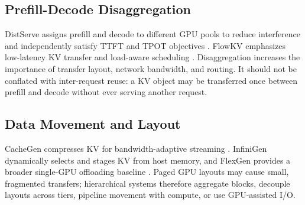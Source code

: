 \documentclass[conference,10pt]{IEEEtran}
\newcommand{\ttft}{TTFT\xspace}
\newcommand{\tpot}{TPOT\xspace}
\begin{document}
\subsection{Prefill-Decode Disaggregation}

DistServe assigns prefill and decode to different GPU pools to reduce interference and independently satisfy \ttft and \tpot objectives \cite{zhong2024distserve}. FlowKV emphasizes low-latency KV transfer and load-aware scheduling \cite{li2025flowkv}. Disaggregation increases the importance of transfer layout, network bandwidth, and routing. It should not be conflated with inter-request reuse: a KV object may be transferred once between prefill and decode without ever serving another request.

\subsection{Data Movement and Layout}

CacheGen compresses KV for bandwidth-adaptive streaming \cite{liu2023cachegen}. InfiniGen dynamically selects and stages KV from host memory, and FlexGen provides a broader single-GPU offloading baseline \cite{lee2024infinigen,sheng2023flexgen}. Paged GPU layouts may cause small, fragmented transfers; hierarchical systems therefore aggregate blocks, decouple layouts across tiers, pipeline movement with compute, or use GPU-assisted I/O.
\end{document}

